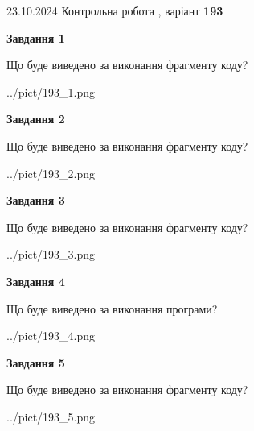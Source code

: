 \documentclass[12pt, ukrainian]{article}
\begin{document}
{\Large{23.10.2024 Контрольна робота , варіант  \No \textbf { 193 }\par}}
{
\begin {large}
{\begin {center}\textbf{Завдання 1}\end {center}}

Що буде виведено за виконання фрагменту коду?\par
\begin{center}
	{../pict/193_1.png}
\end{center}
\newpage

{\begin {center}\textbf{Завдання 2}\end {center}}

Що буде виведено за виконання фрагменту коду?\par
\begin{center}
	{../pict/193_2.png}
\end{center}
\newpage

{\begin {center}\textbf{Завдання 3}\end {center}}

Що буде виведено за виконання фрагменту коду?\par
\begin{center}
	{../pict/193_3.png}
\end{center}
\newpage

{\begin {center}\textbf{Завдання 4}\end {center}}

Що буде виведено за виконання програми?\par
\begin{center}
	{../pict/193_4.png}
\end{center}
\newpage

{\begin {center}\textbf{Завдання 5}\end {center}}

Що буде виведено за виконання фрагменту коду?\par
\begin{center}
	{../pict/193_5.png}
\end{center}
\newpage


\end{large}}
\end{document}
